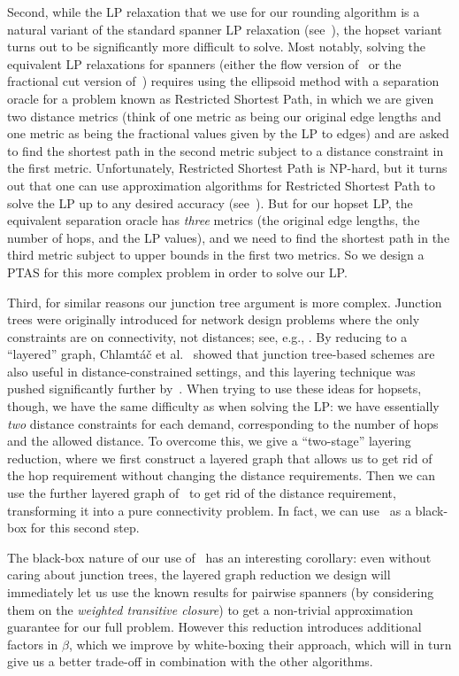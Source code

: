 \documentclass{article}
\theoremstyle{definition}
\theoremstyle{remark}
\begin{document}
Second, while the LP relaxation that we use for our rounding algorithm is a natural variant of the standard spanner LP relaxation (see~\cite{DK11,BBMRY11,DNZ20}), the hopset variant turns out to be significantly more difficult to solve.  Most notably, solving the equivalent LP relaxations for spanners (either the flow version of~\cite{DK11} or the fractional cut version of~\cite{DNZ20}) requires using the ellipsoid method with a separation oracle for a problem known as Restricted Shortest Path, in which we are given two distance metrics (think of one metric as being our original edge lengths and one metric as being the fractional values given by the LP to edges) and are asked to find the shortest path in the second metric subject to a distance constraint in the first metric.  Unfortunately, Restricted Shortest Path is NP-hard, but it turns out that one can use approximation algorithms for Restricted Shortest Path to solve the LP up to any desired accuracy (see~\cite{DK11}).  But for our hopset LP, the equivalent separation oracle has \emph{three} metrics (the original edge lengths, the number of hops, and the LP values), and we need to find the shortest path in the third metric subject to upper bounds in the first two metrics.  So we design a PTAS for this more complex problem in order to solve our LP.

Third, for similar reasons our junction tree argument is more complex. Junction trees were originally introduced for network design problems where the only constraints are on connectivity, not distances; see, e.g., \cite{CEGS11, FKN12}.  By reducing to a ``layered'' graph, Chlamt\'a\v{c} et al.~\cite{CDKL20} showed that junction tree-based schemes are also useful in distance-constrained settings, and this layering technique was pushed significantly further by~\cite{GKL23}.  When trying to use these ideas for hopsets, though, we have the same difficulty as when solving the LP: we have essentially \emph{two} distance constraints for each demand, corresponding to the number of hops and the allowed distance.  To overcome this, we give a ``two-stage'' layering reduction, where we first construct a layered graph that allows us to get rid of the hop requirement without changing the distance requirements.  Then we can use the further layered graph of~\cite{GKL23} to get rid of the distance requirement, transforming it into a pure connectivity problem.  In fact, we can use~\cite{GKL23} as a black-box for this second step.

The black-box nature of our use of~\cite{GKL23} has an interesting corollary: even without caring about junction trees, the layered graph reduction we design will immediately let us use the known results for pairwise spanners \cite{GKL23} (by considering them on the \textit{weighted transitive closure}) to get a non-trivial approximation guarantee for our full problem. However this reduction introduces additional factors in $\beta$, which we improve by white-boxing their approach, which will in turn give us a better trade-off in combination with the other algorithms.
\end{document}
